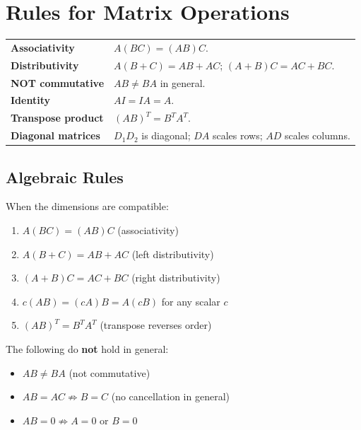 
\section{Rules for Matrix Operations}

\begin{tcolorbox}[colback=gray!6, colframe=gray!40, arc=2pt,
  left=6pt, right=6pt, top=4pt, bottom=4pt,
  title={\small\textbf{Matrix Operations --- Quick Reference}},
  fonttitle=\small\bfseries]
\begin{tabular}{@{}p{}p{}@{}}
\textbf{Associativity}    & $A(BC) = (AB)C$. \\[4pt]
\textbf{Distributivity}   & $A(B+C) = AB + AC$; $(A+B)C = AC + BC$. \\[4pt]
\textbf{NOT commutative}  & $AB \neq BA$ in general. \\[4pt]
\textbf{Identity}         & $AI = IA = A$. \\[4pt]
\textbf{Transpose product}& $(AB)^T = B^T A^T$. \\[4pt]
\textbf{Diagonal matrices}& $D_1 D_2$ is diagonal; $DA$ scales rows; $AD$ scales columns. \\
\end{tabular}
\end{tcolorbox}

\subsection{Algebraic Rules}

\begin{tcolorbox}[colback=thmbox, colframe=thmborder, arc=2pt,
  left=6pt, right=6pt, top=4pt, bottom=4pt,
  title={\small\textbf{Theorem (Rules for Matrix Multiplication)}},
  fonttitle=\small\bfseries]
When the dimensions are compatible:
\begin{enumerate}
  \item $A(BC) = (AB)C$ \hfill (associativity)
  \item $A(B + C) = AB + AC$ \hfill (left distributivity)
  \item $(A + B)C = AC + BC$ \hfill (right distributivity)
  \item $c(AB) = (cA)B = A(cB)$ for any scalar $c$
  \item $(AB)^T = B^T A^T$ \hfill (transpose reverses order)
\end{enumerate}
The following do \textbf{not} hold in general:
\begin{itemize}
  \item $AB \neq BA$ (not commutative)
  \item $AB = AC \not\Rightarrow B = C$ (no cancellation in general)
  \item $AB = 0 \not\Rightarrow A = 0$ or $B = 0$
\end{itemize}
\end{tcolorbox}

